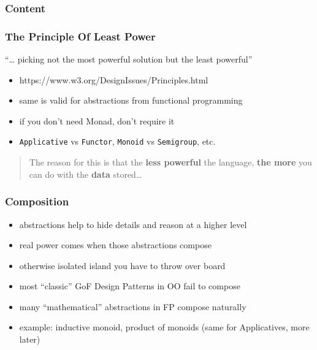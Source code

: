 \documentclass[aspectratio=169]{beamer}
\begin{document}
\begin{frame}[fragile]
  \frametitle{Content}
  \begin{center}
  \end{center}
\end{frame}

\begin{frame}
  \frametitle{The Principle Of Least Power}
    \begin{tcolorbox}[
      fonttitle=\sffamily\bfseries,
      colbacktitle=black,
      colframe=black,
      coltitle=beamer@centricgreen,
      title=The Principle
      ]
      ``\ldots{} picking not the most powerful solution but the least powerful''
  \end{tcolorbox}
  \begin{itemize}
  \item https://www.w3.org/DesignIssues/Principles.html
  \item same is valid for abstractions from functional programming
  \item if you don't need Monad, don't require it
  \item \texttt{Applicative} vs \texttt{Functor}, \texttt{Monoid} vs \texttt{Semigroup}, etc.
  \end{itemize}
  \vfill
  \begin{quote}
    The reason for this is that the \textbf{less powerful} the language, \textbf{the
      more} you can do with the \textbf{data} stored\ldots
  \end{quote}
\end{frame}

\begin{frame}
  \frametitle{Composition}
  \begin{itemize}
  \item abstractions help to hide details and reason at a higher level
  \item real power comes when those abstractions compose
  \item otherwise isolated island you have to throw over board
  \item most ``classic'' GoF Design Patterns in OO fail to compose
  \item many ``mathematical'' abstractions in FP compose naturally
  \item example: inductive monoid, product of monoids (same for Applicatives, more later)
  \end{itemize}
\end{frame}
\end{document}
